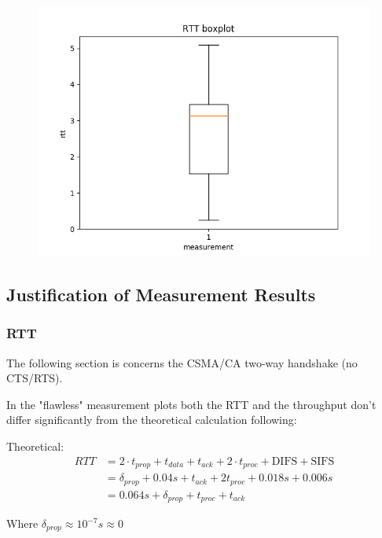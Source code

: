 \documentclass{article}
\begin{document}
\begin{figure}[h] \label{usrp-fails2-5}
	\includegraphics[width=\textwidth]{usrp_fail2_rtt_boxplot}
\end{figure} 

\clearpage

\subsection{Justification of Measurement Results}

\subsubsection{RTT}

The following section is concerns the CSMA/CA two-way handshake (no CTS/RTS).

In the "flawless" measurement plots both the RTT and the throughput don't differ significantly from the theoretical calculation following:

Theoretical:
\begin{equation*}
\begin{split}
	RTT & = 2 \cdot t_{prop}+t_{data}+t_{ack}+2\cdot t_{proc}+\text{DIFS}+\text{SIFS} \\
		& = \delta_{prop}+0.04s+t_{ack}+2t_{proc}+0.018s+0.006s \\
		& = 0.064s + \delta_{prop} + t_{proc} +t_{ack}
\end{split}
\end{equation*} 

Where $\delta_{prop} \approx 10^{-7}s \approx 0 $
\end{document}
